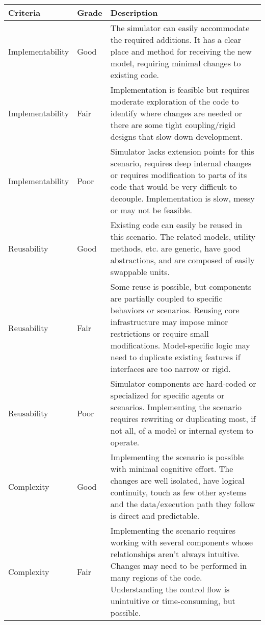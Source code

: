 \documentclass[twoside, 11pt]{article}
\begin{document}
\begin{center}
  \begin{table}[h!]
    \begin{tabularx}{\textwidth}{ | p{2.9cm} | l | X | } 
      \hline
      Criteria & Grade & Description \\ 
      \hline
      Implementability & Good & 
      The simulator can easily accommodate the required additions. It has a clear place and method for receiving the new model, requiring minimal changes to existing code.
      \\ 
      \hline
      Implementability & Fair & 
      Implementation is feasible but requires moderate exploration of the code to identify where changes are needed or there are some tight coupling/rigid designs that slow down development.
      \\ 
      \hline
      Implementability & Poor & 
      Simulator lacks extension points for this scenario, requires deep internal changes or requires modification to parts of its code that would be very difficult to decouple. Implementation is slow, messy or may not be feasible.
      \\ 
      \hline
      Reusability & Good & 
      Existing code can easily be reused in this scenario. The related models, utility methods, etc. are  generic, have good abstractions, and are composed of easily swappable units.
      \\ 
      \hline
      Reusability & Fair & 
      Some reuse is possible, but components are partially coupled to specific behaviors or scenarios. Reusing core infrastructure may impose minor restrictions or require small modifications. Model-specific logic may need to duplicate existing features if interfaces are too narrow or rigid.
      \\ 
      \hline
      Reusability & Poor & 
      Simulator components are hard-coded or specialized for specific agents or scenarios. Implementing the scenario requires rewriting or duplicating most, if not all, of a model or internal system to operate. 
      \\ 
      \hline
      Complexity & Good & 
      Implementing the scenario is possible with minimal cognitive effort. The changes are well isolated, have logical continuity, touch as few other systems and the data/execution path they follow is direct and predictable.
      \\ 
      \hline
      Complexity & Fair & 
      Implementing the scenario requires working with several components whose relationships aren't always intuitive. Changes may need to be performed in many regions of the code. Understanding the control flow is unintuitive or time-consuming, but possible.

\end{tabularx}
\end{table}
\end{center}
\end{document}
